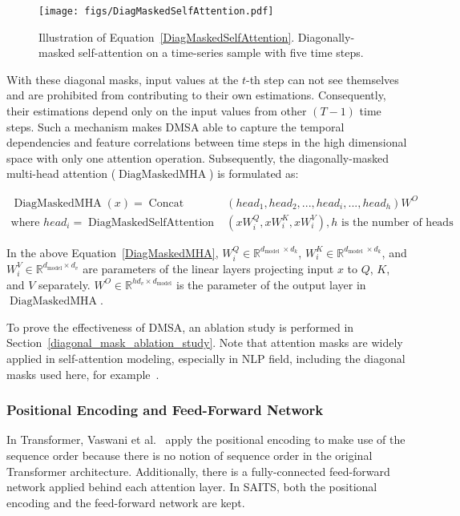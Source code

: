 \documentclass{article}
\begin{document}
\begin{figure}[!h]
	\centering
	\texttt{[image: figs/DiagMaskedSelfAttention.pdf]}
	\caption{Illustration of Equation~\ref{DiagMaskedSelfAttention}. Diagonally-masked self-attention on a time-series sample with five time steps. }
	\label{fig:DiagMaskedSelfAttention}
\end{figure}

With these diagonal masks, input values at the $t$-th step can not see themselves and are prohibited from contributing to their own estimations. Consequently, their estimations depend only on the input values from other $(T-1)$ time steps. Such a mechanism makes DMSA able to capture the temporal dependencies and feature correlations between time steps in the high dimensional space with only one attention operation. Subsequently, the diagonally-masked multi-head attention ($\operatorname{DiagMaskedMHA}$) is formulated as:

\begin{equation} \label{DiagMaskedMHA}
	\begin{aligned}
		\operatorname{DiagMaskedMHA}\left(x\right) =\operatorname{Concat}&\left(head_1, head_2, ..., head_i, ..., head_h\right) W^O \\
		\text{where } head_i =\operatorname{DiagMaskedSelfAttention}&\left(x W_{i}^{Q}, x W_{i}^{K}, x W_{i}^{V}\right), h \text{ is the number of heads}
	\end{aligned}
\end{equation}

In the above Equation~\ref{DiagMaskedMHA}, $W_{i}^{Q} \in \mathbb{R}^{d_{\text {model }} \times d_{k}}$, $W_{i}^{K} \in \mathbb{R}^{d_{\text{model }} \times d_{k}}$, and $W_{i}^{V} \in \mathbb{R}^{d_{\text {model}} \times d_{v}}$ are parameters of the linear layers projecting input $x$ to $Q$, $K$, and $V$ separately. $W^{O} \in \mathbb{R}^{hd_v \times d_{\text {model}}}$ is the parameter of the output layer in $\operatorname{DiagMaskedMHA}$. 

To prove the effectiveness of DMSA, an ablation study is performed in Section~\ref{diagonal_mask_ablation_study}. Note that attention masks are widely applied in self-attention modeling, especially in NLP field, including the diagonal masks used here, for example~\cite{Shen2018DISAN, Yang2019XLNet, Shin2020FA}.

\subsubsection{Positional Encoding and Feed-Forward Network} \label{SAITS: PE and FFN}
In Transformer, Vaswani et al.~\cite{Vaswani2017SelfAttention} apply the positional encoding to make use of the sequence order because there is no notion of sequence order in the original Transformer architecture. Additionally, there is a fully-connected feed-forward network applied behind each attention layer. In SAITS, both the positional encoding and the feed-forward network are kept. 
\end{document}
